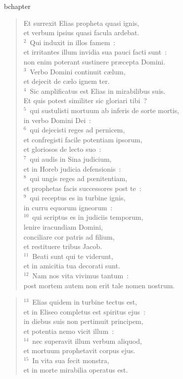 bchapter\begin{verse}\vspace{-19pt}Et surrexit Elias propheta quasi ignis,\\ et verbum ipsius quasi facula ardebat.\\
${}^{2}$~Qui induxit in illos famem~:\\ et irritantes illum invidia sua pauci facti sunt~:\\ non enim poterant sustinere pr\ae cepta Domini.\\
${}^{3}$~Verbo Domini continuit c\ae lum,\\ et dejecit de c\ae lo ignem ter.\\
${}^{4}$~Sic amplificatus est Elias in mirabilibus suis.\\ Et quis potest similiter sic gloriari tibi~?\\
${}^{5}$~qui sustulisti mortuum ab inferis de sorte mortis,\\ in verbo Domini Dei~:\\
${}^{6}$~qui dejecisti reges ad pernicem,\\ et confregisti facile potentiam ipsorum,\\ et gloriosos de lecto suo~:\\
${}^{7}$~qui audis in Sina judicium,\\ et in Horeb judicia defensionis~:\\
${}^{8}$~qui ungis reges ad pœnitentiam,\\ et prophetas facis successores post te~:\\
${}^{9}$~qui receptus es in turbine ignis,\\ in curru equorum igneorum~:\\
${}^{10}$~qui scriptus es in judiciis temporum,\\ lenire iracundiam Domini,\\ conciliare cor patris ad filium,\\ et restituere tribus Jacob.\\
${}^{11}$~Beati sunt qui te viderunt,\\ et in amicitia tua decorati sunt.\\
${}^{12}$~Nam nos vita vivimus tantum~:\\ post mortem autem non erit tale nomen nostrum.\end{verse}


\begin{verse}${}^{13}$~Elias quidem in turbine tectus est,\\ et in Eliseo completus est spiritus ejus~:\\ in diebus suis non pertimuit principem,\\ et potentia nemo vicit illum~:\\
${}^{14}$~nec superavit illum verbum aliquod,\\ et mortuum prophetavit corpus ejus.\\
${}^{15}$~In vita sua fecit monstra,\\ et in morte mirabilia operatus est.\end{verse}


